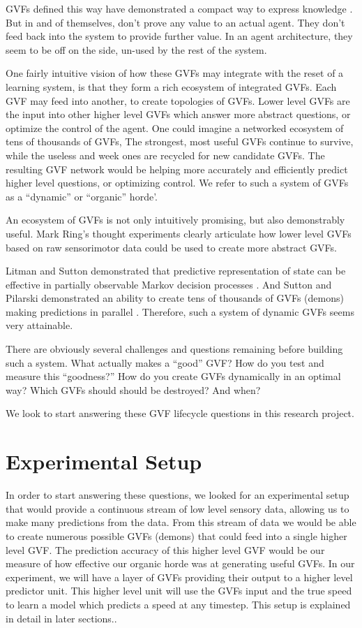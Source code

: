 \documentclass[letterpaper]{article}
\begin{document}
GVFs defined this way have demonstrated a compact way to express knowledge \cite{littman2002predictive}. But in and of themselves, don't prove any value to an actual agent. They don't feed back into the system to provide further value. In an agent architecture, they seem to be off on the side, un-used by the rest of the system.

One fairly intuitive vision of how these GVFs may integrate with the reset of a learning system, is that they form a rich ecosystem of integrated GVFs. Each GVF may feed into another, to create topologies of GVFs. Lower level GVFs are the input into other higher level GVFs which answer more abstract questions, or optimize the control of the agent. One could imagine a networked ecosystem of tens of thousands of GVFs, The strongest, most useful GVFs continue to survive, while the useless and week ones are recycled for new candidate GVFs. The resulting GVF network would be helping more accurately and efficiently predict higher level questions, or optimizing control. We refer to such a system of GVFs as a ``dynamic'' or ``organic'' horde'.

An ecosystem of GVFs is not only intuitively promising, but also demonstrably useful. Mark Ring's thought experiments \cite{representingknowledge} clearly articulate how lower level GVFs based on raw sensorimotor data could be used to create more abstract GVFs. 

Litman and Sutton demonstrated that predictive representation of state can be effective in partially observable Markov decision processes \cite{littman2002predictive}. And Sutton and Pilarski demonstrated an ability to create tens of thousands of GVFs (demons) making predictions in parallel \cite{sutton2011horde}. Therefore, such a system of dynamic GVFs seems very attainable. 

There are obviously several challenges and questions remaining before building such a system. What actually makes a ``good'' GVF? How do you test and measure this ``goodness?'' How do you create GVFs dynamically in an optimal way? Which GVFs should should be destroyed? And when?

We look to start answering these GVF lifecycle questions in this research project.


\section{Experimental Setup}
In order to start answering these questions, we looked for an experimental setup that would provide a continuous stream of low level sensory data, allowing us to make many predictions from the data. From this stream of data we would be able to create numerous possible GVFs (demons) that could feed into a single higher level GVF. The prediction accuracy of this higher level GVF would be our measure of how effective our organic horde was at generating useful GVFs. In our experiment, we will have a layer of GVFs providing their output to a higher level predictor unit. This higher level unit will use the GVFs input and the true speed to learn a model which predicts a speed at any timestep. This setup is explained in detail in later sections..
\end{document}
